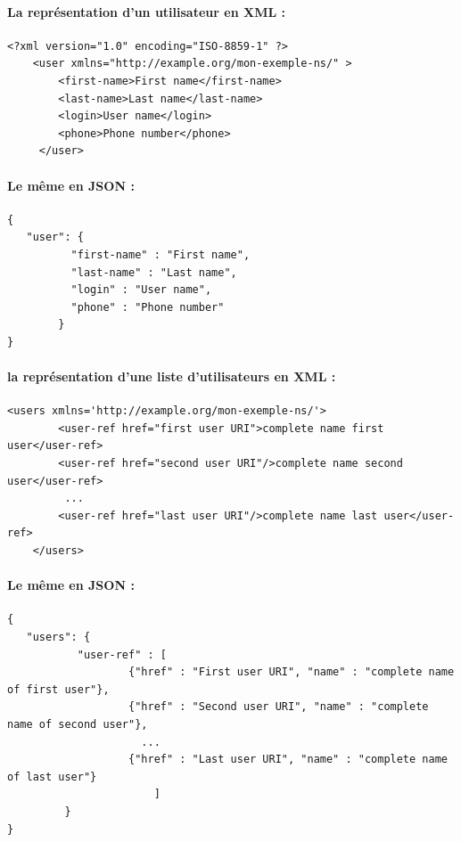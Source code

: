 \documentclass{report}
\begin{document}
\paragraph{La représentation d'un utilisateur en XML :}
      
\begin{lstlisting}[style=XML]
    <?xml version="1.0" encoding="ISO-8859-1" ?>
    <user xmlns="http://example.org/mon-exemple-ns/" >
        <first-name>First name</first-name>
        <last-name>Last name</last-name>
        <login>User name</login>
        <phone>Phone number</phone>
     </user>
\end{lstlisting}

\paragraph{Le même en JSON :}

\begin{lstlisting}[style=XML]
 {
   "user": {
	      "first-name" : "First name",
	      "last-name" : "Last name",
	      "login" : "User name",
	      "phone" : "Phone number"	
	    }
}
\end{lstlisting}

\paragraph{la représentation d'une liste d'utilisateurs en XML :}

\begin{lstlisting}[style=XML]
    <users xmlns='http://example.org/mon-exemple-ns/'>
        <user-ref href="first user URI">complete name first user</user-ref>
        <user-ref href="second user URI"/>complete name second user</user-ref>
         ...
        <user-ref href="last user URI"/>complete name last user</user-ref>
    </users>
\end{lstlisting}

\paragraph{Le même en JSON :}

\begin{lstlisting}[style=XML]
{
   "users": {
	       "user-ref" : [
			       {"href" : "First user URI", "name" : "complete name of first user"},
			       {"href" : "Second user URI", "name" : "complete name of second user"},
			         ...
			       {"href" : "Last user URI", "name" : "complete name of last user"}
		               ]
	     }
}
\end{lstlisting}
      
\end{document}
